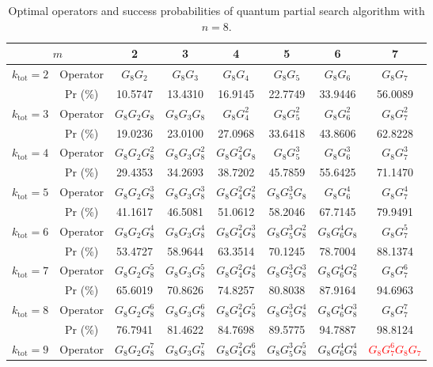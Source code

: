 \documentclass[a4paper,10pt]{article}
\numberwithin{equation}{section}
\begin{document}
\begin{table}[t]
    \caption{Optimal operators and success probabilities of quantum partial search algorithm with $n=8$.}
    \centering
    \begin{tabular}{c|c|c|c|c|c|c|c}
    \hline\hline
         \multicolumn{2}{c|}{$m$} & 2 & 3 & 4 & 5 & 6 & 7 \\\hline 
         \multirow{2}{*}{$k_\text{tot} = 2$} & Operator & $G_8G_2$ & $G_8G_3$ & $G_8G_4$ & $G_8G_5$ & $G_8G_6$ & $G_8G_7$ \\
         & Pr (\%) & 10.5747 & 13.4310 & 16.9145 & 22.7749 & 33.9446 & 56.0089 \\\hline 
         \multirow{2}{*}{$k_\text{tot} = 3$} & Operator & $G_8G_2G_8$ & $G_8G_3G_8$ & $G_8G^2_4$ & $G_8G^2_5$ & $G_8G^2_6$ & $G_8G^2_7$ \\
         & Pr (\%) & 19.0236 & 23.0100 & 27.0968 & 33.6418 & 43.8606 & 62.8228 \\\hline 
         \multirow{2}{*}{$k_\text{tot} = 4$} & Operator & $G_8G_2G^2_8$ & $G_8G_3G^2_8$ & $G_8G^2_4G_8$ & $G_8G^3_5$ & $G_8G^3_6$ & $G_8G^3_7$ \\
         & Pr (\%) & 29.4353 & 34.2693 & 38.7202 & 45.7859 & 55.6425 & 71.1470 \\\hline 
         \multirow{2}{*}{$k_\text{tot} = 5$} & Operator & $G_8G_2G^3_8$ & $G_8G_3G^3_8$ & $G_8G_4^2G^2_8$ & $G_8G_5^3G_8$ & $G_8G_6^4$ & $G_8G_7^4$ \\
         & Pr (\%) & 41.1617 & 46.5081 & 51.0612 & 58.2046 & 67.7145 & 79.9491 \\\hline 
         \multirow{2}{*}{$k_\text{tot} = 6$} & Operator & $G_8G_2G^4_8$ & $G_8G_3G^4_8$ & $G_8G_4^2G^3_8$ & $G_8G_5^3G^2_8$ & $G_8G_6^4G_8$ & $G_8G_7^5$ \\
         & Pr (\%) & 53.4727 & 58.9644 & 63.3514 & 70.1245 & 78.7004 & 88.1374 \\\hline 
         \multirow{2}{*}{$k_\text{tot} = 7$} & Operator & $G_8G_2G^5_8$ & $G_8G_3G^5_8$ & $G_8G^2_4G^4_8$ & $G_8G^3_5G^3_8$ & $G_8G^4_6G^2_8$ & $G_8G_7^6$ \\
         & Pr (\%) & 65.6019 & 70.8626 & 74.8257 & 80.8038 & 87.9164 & 94.6963 \\\hline 
         \multirow{2}{*}{$k_\text{tot} = 8$} & Operator & $G_8G_2G^6_8$ & $G_8G_3G^6_8$ & $G_8G^2_4G^5_8$ & $G_8G^3_5G^4_8$ & $G_8G^4_6G^3_8$ & $G_8G^7_7$ \\
         & Pr (\%) & 76.7941 & 81.4622 & 84.7698 & 89.5775 & 94.7887 & 98.8124 \\\hline 
         \multirow{2}{*}{$k_\text{tot} = 9$} & Operator & $G_8G_2G^7_8$ & $G_8G_3G^7_8$ & $G_8G_4^2G^6_8$ & $G_8G_5^3G^5_8$ & $G_8G_6^4G^4_8$ & \textcolor{red}{$G_8G^6_7G_8G_7$} \\

\end{tabular}
\end{table}
\end{document}
